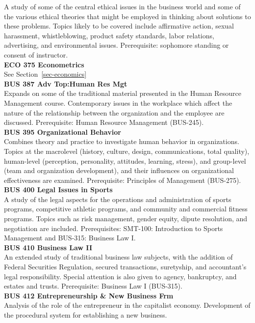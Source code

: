 \documentclass[
  letterpaper,
]{scrbook}
\begin{document}
A study of some of the central ethical issues in the business world and
some of the various ethical theories that might be employed in thinking
about solutions to these problems. Topics likely to be covered include
affirmative action, sexual harassment, whistleblowing, product safety
standards, labor relations, advertising, and environmental issues.
Prerequisite: sophomore standing or consent of instructor.\\
\textbf{ECO 375 Econometrics}\\
See Section~\ref{sec-economics}\\
\textbf{BUS 387 Adv Top:Human Res Mgt}\\
Expands on some of the traditional material presented in the Human
Resource Management course. Contemporary issues in the workplace which
affect the nature of the relationship between the organization and the
employee are discussed. Prerequisite: Human Resource Management
(BUS-245).\\
\textbf{BUS 395 Organizational Behavior}\\
Combines theory and practice to investigate human behavior in
organizations. Topics at the macrolevel (history, culture, design,
communications, total quality), human-level (perception, personality,
attitudes, learning, stress), and group-level (team and organization
development), and their influences on organizational effectiveness are
examined. Prerequisite: Principles of Management (BUS-275).\\
\textbf{BUS 400 Legal Issues in Sports}\\
A study of the legal aspects for the operations and administration of
sports programs, competitive athletic programs, and community and
commercial fitness programs. Topics such as risk management, gender
equity, dipute resolution, and negotiation are included. Prerequisites:
SMT-100: Introduction to Sports Management and BUS-315: Business Law
I.\\
\textbf{BUS 410 Business Law II}\\
An extended study of traditional business law subjects, with the
addition of Federal Securities Regulation, secured transactions,
suretyship, and accountant's legal responsibility. Special attention is
also given to agency, bankruptcy, and estates and trusts. Prerequisite:
Business Law I (BUS-315).\\
\textbf{BUS 412 Entrepreneurship \& New Business Frm}\\
Analysis of the role of the entrepreneur in the capitalist economy.
Development of the procedural system for establishing a new business.
\end{document}
